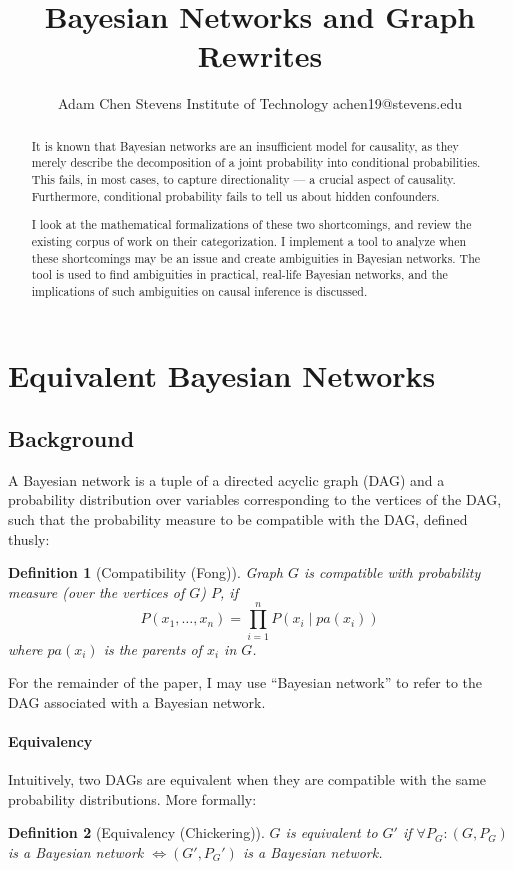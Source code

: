 \documentclass{article}
\title{Bayesian Networks and Graph Rewrites}
\author{
	Adam Chen
	\affiliations
	Stevens Institute of Technology
	\emails
	achen19@stevens.edu
}
\newtheorem{definition}{Definition}
\begin{document}
	
	\maketitle
	
	\begin{abstract}
		It is known that Bayesian networks are an insufficient model for causality, as they merely describe the decomposition of a joint probability into conditional probabilities.
		This fails, in most cases, to capture directionality --- a crucial aspect of causality.
		Furthermore, conditional probability fails to tell us about hidden confounders.
		
		I look at the mathematical formalizations of these two shortcomings, and review the existing corpus of work on their categorization.
		I implement a tool to analyze when these shortcomings may be an issue and create ambiguities in Bayesian networks.
		The tool is used to find ambiguities in practical, real-life Bayesian networks, and the implications of such ambiguities on causal inference is discussed.
	\end{abstract}
	
		
	\section{Equivalent Bayesian Networks}
	\subsection{Background}
	A Bayesian network is a tuple of a directed acyclic graph (DAG) and a probability distribution over variables corresponding to the vertices of the DAG, such that the probability measure to be compatible with the DAG, defined thusly:
	\begin{definition}[Compatibility (Fong)\cite{fong2013causal}]
		Graph $G$ is compatible with probability measure (over the vertices of $G$) $P$, if
		$$
		P(x_1, \dots, x_n) = \prod_{i=1}^n{P(x_i \mid pa(x_i))}
		$$
		where $pa(x_i)$ is the parents of $x_i$ in $G$.
	\end{definition}
	For the remainder of the paper, I may use ``Bayesian network'' to refer to the DAG associated with a Bayesian network.
	
	\paragraph{Equivalency} Intuitively, two DAGs are equivalent when they are compatible with the same probability distributions. More formally:
	\begin{definition}[Equivalency (Chickering)\cite{chickering2013transformational}]
		$G$ is equivalent to $G'$ if $\forall P_G: (G, P_G)$ is a Bayesian network $\iff (G', P_G')$ is a Bayesian network.
	\end{definition}
	
\end{document}

